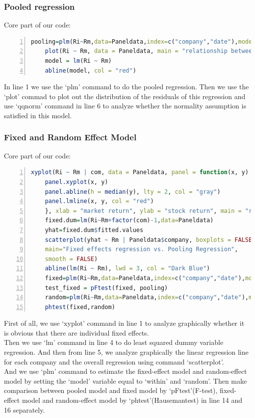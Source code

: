     \subsubsection{Pooled regression}
    \noindent Core part of our code:\\
    \begin{lstlisting}[language=R,numbers=left, numberstyle=\normalsize]
    pooling=plm(Ri~Rm,data=Paneldata,index=c("company","date"),model="pooling")
    plot(Ri ~ Rm, data = Paneldata, main = "relationship between market return and stock return",  xlab = "market return", ylab = "stock return")
    model = lm(Ri ~ Rm)
    abline(model, col = "red")

    \end{lstlisting}
    In line 1 we use the `plm' command to do the pooled regression. Then we use the `plot' commad to plot out the distribution of the residuals of this regression and use `qqnorm' command in line 6 to analyze whether the normality assumption is satisfied in this model.\\

    \subsubsection{Fixed and Random Effect Model}
    \noindent Core part of our code:\\
    \begin{lstlisting}[language=R,numbers=left, numberstyle=\normalsize]
    xyplot(Ri ~ Rm | com, data = Paneldata, panel = function(x, y) {
    panel.xyplot(x, y)
    panel.abline(h = median(y), lty = 2, col = "gray")
    panel.lmline(x, y, col = "red")
    }, xlab = "market return", ylab = "stock return", main = "relationship between market return and stock return")
    fixed.dum=lm(Ri~Rm+factor(com)-1,data=Paneldata)
    yhat=fixed.dum$fitted.values
    scatterplot(yhat ~ Rm | Paneldata$company, boxplots = FALSE, xlab = "Market price", ylab = "yhat", legend.plot = FALSE,
    main="Fixed effects regression vs. Pooling Regression",
    smooth = FALSE)
    abline(lm(Ri ~ Rm), lwd = 3, col = "Dark Blue")
    fixed=plm(Ri~Rm,data=Paneldata,index=c("company","date"),model="within")
    test_fixed = pFtest(fixed, pooling)
    random=plm(Ri~Rm,data=Paneldata,index=c("company","date"),model="random")
    phtest(fixed,random)
    \end{lstlisting}
    \indent First of all, we use `xyplot' command in line 1 to analyze graphically whether it is obvious that there are individual fixed effects.\\
    [\baselineskip]\indent Then we use `lm' command in line 4 to do least squared dummy variable regression. And then from line 5, we analyze graphically the linear regression line for each company and the overall regression using command `scatterplot'.\\
    [\baselineskip]\indent And we use `plm' command to estimate the fixed-effect model and random-effect model by setting the `model' variable equal to `within' and `random'. Then make comparison between pooled model and fixed model by `pFtest'(F-test), fixed-effect model and random-effect model by `phtest'(Hausemantest) in line 14 and 16 separately.\\

